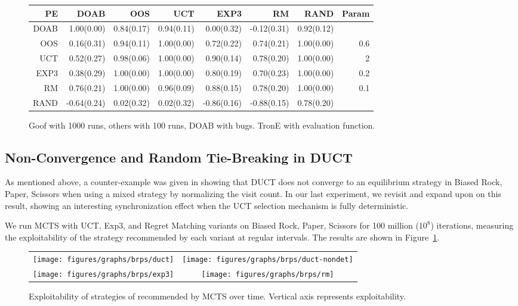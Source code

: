\begin{figure}
\begin{tiny}
\begin{tabular}{|r|rrrrrr|r|}\hline
PE&DOAB&OOS&UCT&EXP3&RM&RAND&Param\\\hline
DOAB&1.00(0.00)&0.84(0.17)&0.94(0.11)&0.00(0.32)&-0.12(0.31)&0.92(0.12)&\\
OOS&0.16(0.31)&0.94(0.11)&1.00(0.00)&0.72(0.22)&0.74(0.21)&1.00(0.00)&0.6\\
UCT&0.52(0.27)&0.98(0.06)&1.00(0.00)&0.90(0.14)&0.78(0.20)&1.00(0.00)&2\\
EXP3&0.38(0.29)&1.00(0.00)&1.00(0.00)&0.80(0.19)&0.70(0.23)&1.00(0.00)&0.2\\
RM&0.76(0.21)&1.00(0.00)&0.96(0.09)&0.88(0.15)&0.78(0.20)&1.00(0.00)&0.1\\
RAND&-0.64(0.24)&0.02(0.32)&0.02(0.32)&-0.86(0.16)&-0.88(0.15)&0.78(0.20)&\\\hline
\end{tabular}
\end{tiny}
\caption{Goof with 1000 runs, others with 100 runs, DOAB with bugs. TronE with evaluation function.}
\end{figure}

\subsection{Non-Convergence and Random Tie-Breaking in DUCT} 

As mentioned above, a counter-example was given in \cite{Shafiei09} showing that 
DUCT does not converge to an equilibrium strategy in Biased Rock, Paper, Scissors 
when using a mixed strategy by normalizing the visit count.
In our last experiment, we revisit and expand upon on this result, showing an interesting 
synchronization effect when the UCT selection mechanism is fully deterministic.

We run MCTS with UCT, Exp3, and Regret Matching variants on Biased Rock, Paper, Scissors
for 100 million ($10^8$) iterations, measuring the exploitability of the strategy recommended by 
each variant at regular intervals. The results are shown in Figure~\ref{fig:expl-brps}.

\begin{figure}[t]
\begin{tabular}{cc}
\hspace{-1cm} \texttt{[image: figures/graphs/brps/duct]} & \texttt{[image: figures/graphs/brps/duct-nondet]}\\
\hspace{-1cm} \texttt{[image: figures/graphs/brps/exp3]} & \texttt{[image: figures/graphs/brps/rm]}\\
\end{tabular}
\caption{Exploitability of strategies of recommended by MCTS over time. Vertical axis represents exploitability. \label{fig:expl-brps}}
\end{figure}

